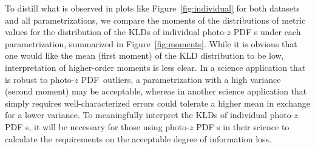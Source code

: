 \documentclass[\docopts]{\docclass}
\newcommand{\pz}{photo-$z$ PDF\xspace}
\begin{document}
To distill what is observed in plots like Figure~\ref{fig:individual} for both 
datasets and all parametrizations, we compare the moments of the distributions 
of metric values for the distribution of the KLDs of individual \pz s under 
each parametrization, summarized in Figure~\ref{fig:moments}.
While it is obvious that one would like the mean (first moment) of the KLD 
distribution to be low, interpretation of higher-order moments is less clear.
In a science application that is robust to \pz\ outliers, a parametrization 
with a high variance (second moment) may be acceptable, whereas in another 
science application that simply requires well-characterized errors could 
tolerate a higher mean in exchange for a lower variance.
To meaningfully interpret the KLDs of individual \pz s, it will be necessary 
for those using \pz s in their science to calculate the requirements on the 
acceptable degree of information loss.
\end{document}
